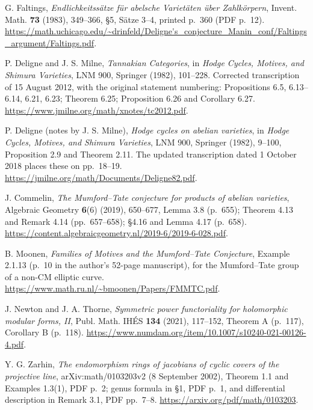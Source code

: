 G. Faltings, \emph{Endlichkeitss\"atze f\"ur abelsche Variet\"aten
\"uber Zahlk\"orpern}, Invent. Math. \textbf{73} (1983), 349--366,
\S5, S\"atze 3--4, printed p.~360 (PDF p.~12).
\url{https://math.uchicago.edu/~drinfeld/Deligne's_conjecture_Manin_conf/Faltings_argument/Faltings.pdf}.

P. Deligne and J. S. Milne, \emph{Tannakian Categories}, in
\emph{Hodge Cycles, Motives, and Shimura Varieties}, LNM 900,
Springer (1982), 101--228.  Corrected transcription of 15 August 2012,
with the original statement numbering: Propositions 6.5, 6.13--6.14,
6.21, 6.23; Theorem 6.25; Proposition 6.26 and Corollary 6.27.
\url{https://www.jmilne.org/math/xnotes/tc2012.pdf}.

P. Deligne (notes by J. S. Milne), \emph{Hodge cycles on abelian
varieties}, in \emph{Hodge Cycles, Motives, and Shimura Varieties},
LNM 900, Springer (1982), 9--100, Proposition 2.9 and Theorem 2.11.
The updated transcription dated 1 October 2018 places these on
pp.~18--19.
\url{https://jmilne.org/math/Documents/Deligne82.pdf}.

J. Commelin, \emph{The Mumford--Tate conjecture for products of
abelian varieties}, Algebraic Geometry \textbf{6}(6) (2019), 650--677,
Lemma 3.8 (p.~655); Theorem 4.13 and Remark 4.14 (pp.~657--658);
\S4.16 and Lemma 4.17 (p.~658).
\url{https://content.algebraicgeometry.nl/2019-6/2019-6-028.pdf}.

B. Moonen, \emph{Families of Motives and the Mumford--Tate Conjecture},
Example 2.1.13 (p.~10 in the author's 52-page manuscript),
for the Mumford--Tate group of a non-CM elliptic curve.
\url{https://www.math.ru.nl/~bmoonen/Papers/FMMTC.pdf}.

J. Newton and J. A. Thorne, \emph{Symmetric power functoriality for
holomorphic modular forms, II}, Publ. Math. IH\'ES \textbf{134}
(2021), 117--152, Theorem A (p.~117), Corollary B (p.~118).
\url{https://www.numdam.org/item/10.1007/s10240-021-00126-4.pdf}.

Y. G. Zarhin, \emph{The endomorphism rings of jacobians of cyclic
covers of the projective line}, arXiv:math/0103203v2 (8 September
2002), Theorem 1.1 and Examples 1.3(1), PDF p.~2; genus formula in
\S1, PDF p.~1, and differential description in Remark 3.1,
PDF pp.~7--8.
\url{https://arxiv.org/pdf/math/0103203}.
